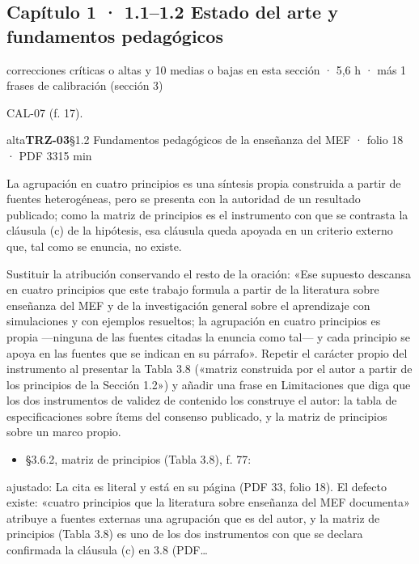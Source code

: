 \subsection{Capítulo 1 · 1.1–1.2 Estado del arte y fundamentos pedagógicos}
{\small\color{gris} correcciones críticas o altas y 10 medias o bajas en esta sección · 5,6 h · más 1 frases de calibración (sección 3)}\par
{\small{}CAL-07 (f. 17).\par}
\begin{ficha}{alta}{\casilla\textbf{TRZ-03}\quad{}\quad §1.2 Fundamentos pedagógicos de la enseñanza del MEF · folio 18 · PDF 33\hfill 15 min}
\par
{}La agrupación en cuatro principios es una síntesis propia construida a partir de fuentes heterogéneas, pero se presenta con la autoridad de un resultado publicado; como la matriz de principios es el instrumento con que se contrasta la cláusula (c) de la hipótesis, esa cláusula queda apoyada en un criterio externo que, tal como se enuncia, no existe.\par
{}Sustituir la atribución conservando el resto de la oración: «Ese supuesto descansa en cuatro principios que este trabajo formula a partir de la literatura sobre enseñanza del MEF y de la investigación general sobre el aprendizaje con simulaciones y con ejemplos resueltos; la agrupación en cuatro principios es propia —ninguna de las fuentes citadas la enuncia como tal— y cada principio se apoya en las fuentes que se indican en su párrafo». Repetir el carácter propio del instrumento al presentar la Tabla 3.8 («matriz construida por el autor a partir de los principios de la Sección 1.2») y añadir una frase en Limitaciones que diga que los dos instrumentos de validez de contenido los construye el autor: la tabla de especificaciones sobre ítems del consenso publicado, y la matriz de principios sobre un marco propio.\par
{}\begin{itemize}[leftmargin=1.2em,itemsep=1pt,topsep=1pt]
\item {\small §3.6.2, matriz de principios (Tabla 3.8), f. 77: }
\end{itemize}
{\footnotesize\color{gris}ajustado: La cita es literal y está en su página (PDF 33, folio 18). El defecto existe: «cuatro principios que la literatura sobre enseñanza del MEF documenta» atribuye a fuentes externas una agrupación que es del autor, y la matriz de principios (Tabla 3.8) es uno de los dos instrumentos con que se declara confirmada la cláusula (c) en 3.8 (PDF…\par}
\end{ficha}

